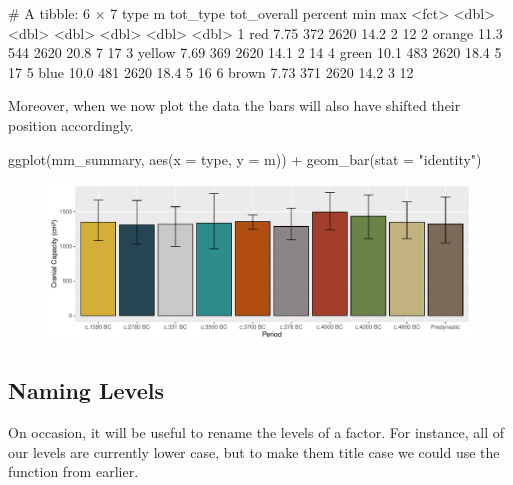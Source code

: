 
\begin{outR}
# A tibble: 6 × 7
  type       m tot_type tot_overall percent   min   max
  <fct>  <dbl>    <dbl>       <dbl>   <dbl> <dbl> <dbl>
1 red     7.75      372        2620    14.2     2    12
2 orange 11.3       544        2620    20.8     7    17
3 yellow  7.69      369        2620    14.1     2    14
4 green  10.1       483        2620    18.4     5    17
5 blue   10.0       481        2620    18.4     5    16
6 brown   7.73      371        2620    14.2     3    12
\end{outR}

\noindent

Moreover, when we now plot the data the bars will also have shifted their position accordingly.

\begin{inR}
ggplot(mm_summary, aes(x = type, y = m)) +
  geom_bar(stat = "identity")
\end{inR}

\vspace{2em}

\begin{figure}[H]
\includegraphics[scale = .75]{graphics/ch3Figs/bar_5.pdf}
\end{figure}

\subsection{Naming Levels}

On occasion, it will be useful to rename the levels of a factor. For instance, all of our levels are currently lower case, but to make them title case we could use the  function from earlier.

